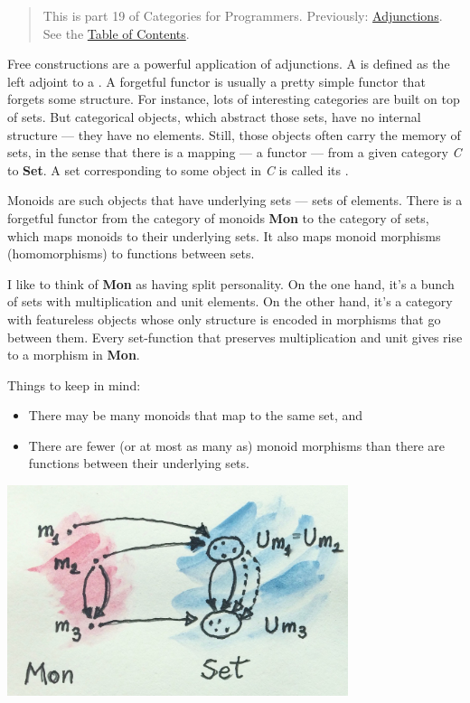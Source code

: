 \begin{quote}
This is part 19 of Categories for Programmers. Previously:
\href{https://bartoszmilewski.com/2016/04/18/adjunctions/}{Adjunctions}.
See the
\href{https://bartoszmilewski.com/2014/10/28/category-theory-for-programmers-the-preface/}{Table
of Contents}.
\end{quote}

Free constructions are a powerful application of adjunctions. A
 is defined as the left adjoint to a . A forgetful functor is usually a pretty simple functor that
forgets some structure. For instance, lots of interesting categories are
built on top of sets. But categorical objects, which abstract those
sets, have no internal structure --- they have no elements. Still, those
objects often carry the memory of sets, in the sense that there is a
mapping --- a functor --- from a given category \emph{C} to
\textbf{Set}. A set corresponding to some object in \emph{C} is called
its .

Monoids are such objects that have underlying sets --- sets of elements.
There is a forgetful functor  from the category of monoids
\textbf{Mon} to the category of sets, which maps monoids to their
underlying sets. It also maps monoid morphisms (homomorphisms) to
functions between sets.

I like to think of \textbf{Mon} as having split personality. On the one
hand, it's a bunch of sets with multiplication and unit elements. On the
other hand, it's a category with featureless objects whose only
structure is encoded in morphisms that go between them. Every
set-function that preserves multiplication and unit gives rise to a
morphism in \textbf{Mon}.

Things to keep in mind:

\begin{itemize}
\tightlist
\item
  There may be many monoids that map to the same set, and
\item
  There are fewer (or at most as many as) monoid morphisms than there
  are functions between their underlying sets.
\end{itemize}

\hypertarget{attachment_5532}{}
\includegraphics[width=3.92708in]{images/forgetful.jpg}

